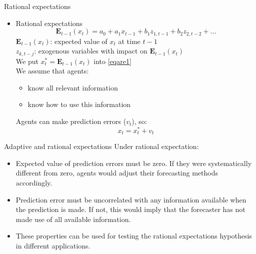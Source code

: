 \documentclass{beamer}
\begin{document}
\begin{frame}{Rational expectations}
\begin{itemize}
\item Rational expectations
$$\mathbf{E}_{t-1}(x_t)=a_0+a_1 x_{t-1} + b_1 z_{1,t-1}+b_2 z_{2, t-2}+\dots$$
$\mathbf{E}_{t-1}(x_t)$: expected value of $x_t$ at time $t-1$\\
$z_{k,t-j}$: exogenous variables with impact on $\mathbf{E}_{t-1}(x_t)$\\
\vspace{0.3cm}
We put $x_t^\ast = \mathbf{E}_{t-1}(x_t)$ into \eqref{eqare1}\\
\vspace{0.3cm}
We assume that agents:
\begin{itemize}
\item know all relevant information
\item know how to use this information
\end{itemize}
\vspace{0.3cm}
Agents can make prediction errors ($v_t$), so: $$x_t=x^\ast_t+v_t $$
\end{itemize}
\end{frame}


\begin{frame}{Adaptive and rational expectations}
Under rational expectation:
\vspace{0.3cm}
\begin{itemize}
\item Expected value of prediction errors must be zero. If they were systematically different from zero, agents would adjust their forecasting methods accordingly.
\vspace{0.3cm}
\item Prediction error must be uncorrelated with any information available when the prediction is made. If not, this would imply that the forecaster has not made use of all
available information.
\vspace{0.3cm}
\item These properties can be used for testing the rational expectations hypothesis in different applications.
\end{itemize}
\end{frame}


\end{document}
